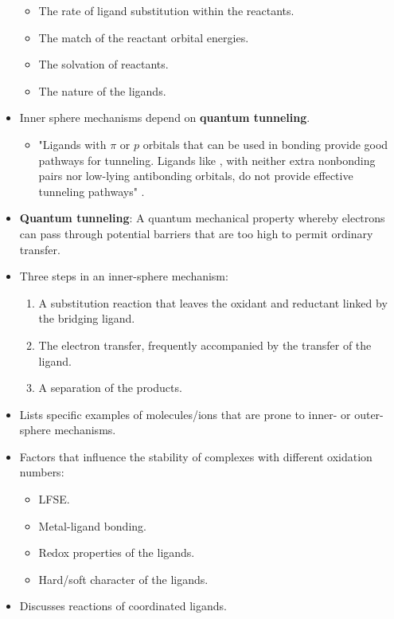 \documentclass[../notes.tex]{subfiles}
\begin{document}
\begin{itemize}
    \begin{itemize}
        \item The rate of ligand substitution within the reactants.
        \item The match of the reactant orbital energies.
        \item The solvation of reactants.
        \item The nature of the ligands.
    \end{itemize}
    \item Inner sphere mechanisms depend on \textbf{quantum tunneling}.
    \begin{itemize}
        \item "Ligands with $\pi$ or $p$ orbitals that can be used in bonding provide good pathways for tunneling. Ligands like , with neither extra nonbonding pairs nor low-lying antibonding orbitals, do not provide effective tunneling pathways" \parencite[463]{bib:MiesslerFischerTarr}.
    \end{itemize}
    \item \textbf{Quantum tunneling}: A quantum mechanical property whereby electrons can pass through potential barriers that are too high to permit ordinary transfer.
    \item Three steps in an inner-sphere mechanism:
    \begin{enumerate}
        \item A substitution reaction that leaves the oxidant and reductant linked by the bridging ligand.
        \item The electron transfer, frequently accompanied by the transfer of the ligand.
        \item A separation of the products.
    \end{enumerate}
    \item Lists specific examples of molecules/ions that are prone to inner- or outer-sphere mechanisms.
    \item Factors that influence the stability of complexes with different oxidation numbers:
    \begin{itemize}
        \item LFSE.
        \item Metal-ligand bonding.
        \item Redox properties of the ligands.
        \item Hard/soft character of the ligands.
    \end{itemize}
    \item Discusses reactions of coordinated ligands.
\end{itemize}
\end{document}
